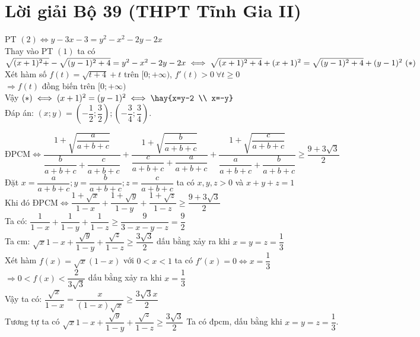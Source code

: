 \section{Lời giải Bộ 39 (THPT Tĩnh Gia II)}

\lgi 
\vspace{5cm}

\hda 
PT $(2)\iff y-3x-3=y^2-x^2-2y-2x$\\
Thay vào PT $(1)$ ta có\\
$\sqrt{(x+1)^2+}-\sqrt{(y-1)^2+4}=y^2-x^2-2y-2x\\
\iff \sqrt{(x+1)^2+4}+(x+1)^2=\sqrt{(y-1)^2+4}+(y-1)^2~(*)$\\
Xét hàm số $f(t)=\sqrt{t+4}+t$ trên $[0;+\infty)$, $f'(t)>0~\forall t\ge 0$\\
$\Rightarrow f(t)$ đồng biến trên $[0;+\infty)$\\
Vậy $(*)\iff (x+1)^2=(y-1)^2\iff \hay{x=y-2 \\ x=-y}$\\
Đáp án: $(x;y)=\left(-\dfrac{1}{2};\dfrac{3}{2}\right);\left(-\dfrac{3}{4};\dfrac{3}{4}\right)$.

\hda 
ĐPCM$\iff \dfrac{1+\sqrt{\dfrac{a}{a+b+c}}}{\dfrac{b}{a+b+c}+\dfrac{c}{a+b+c}}+\dfrac{1+\sqrt{\dfrac{b}{a+b+c}}}{\dfrac{c}{a+b+c}+\dfrac{a}{a+b+c}}+\dfrac{1+\sqrt{\dfrac{c}{a+b+c}}}{\dfrac{a}{a+b+c}+\dfrac{b}{a+b+c}}\ge \dfrac{9+3\sqrt{3}}{2}$\\
Đặt $x=\dfrac{a}{a+b+c};y=\dfrac{b}{a+b+c};z=\dfrac{c}{a+b+c}$ ta có $x,y,z>0$ và $x+y+z=1$\\
Khi đó ĐPCM$\iff \dfrac{1+\sqrt{x}}{1-x}+\dfrac{1+\sqrt{y}}{1-y}+\dfrac{1+\sqrt{z}}{1-z}\ge \dfrac{9+3\sqrt{3}}{2}$\\
Ta có: $\dfrac{1}{1-x}+\dfrac{1}{1-y}+\dfrac{1}{1-z}\ge \dfrac{9}{3-x-y-z}=\dfrac{9}{2}$\\
Ta cm: $\sqrt{x}{1-x}+\dfrac{\sqrt{y}}{1-y}+\dfrac{\sqrt{z}}{1-z}\ge \dfrac{3\sqrt{3}}{2}$ dấu bằng xảy ra khi $x=y=z=\dfrac{1}{3}$\\
Xét hàm $f(x)=\sqrt{x}(1-x)$ với $0<x<1$ ta có $f'(x)=0\iff x=\dfrac{1}{3}$\\
$\Rightarrow 0<f(x)<\dfrac{2}{3\sqrt{3}}$ dấu bằng xảy ra khi $x=\dfrac{1}{3}$\\
Vậy ta có: $\dfrac{\sqrt{x}}{1-x}=\dfrac{x}{(1-x)\sqrt{x}}\ge \dfrac{3\sqrt{3}x}{2}$\\
Tương tự ta có $\sqrt{x}{1-x}+\dfrac{\sqrt{y}}{1-y}+\dfrac{\sqrt{z}}{1-z}\ge \dfrac{3\sqrt{3}}{2}$
Ta có đpcm, dấu bằng khi $x=y=z=\dfrac{1}{3}$.

